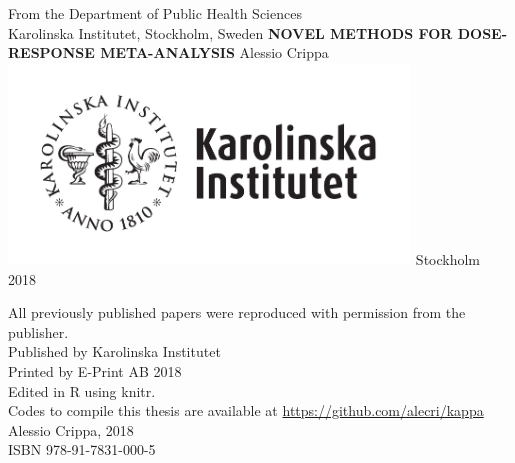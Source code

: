 \documentclass[11pt,a4paper,twoside,openany]{book}\usepackage{knitr}
\begin{document}
\frontmatter
\pagestyle{nothing}

%

\begin{titlepage}
\begin{center}
\large
From the Department of Public Health Sciences \\
Karolinska Institutet, Stockholm, Sweden        
\vfill
\Large
\textbf{\textsf{NOVEL METHODS FOR DOSE-RESPONSE META-ANALYSIS}}
\vfill
\Large
Alessio Crippa
\vfill
\includegraphics[width=0.8\textwidth]{figures/ki-logo_pos}
\vfill
\large
Stockholm 2018        
\end{center}
\restoregeometry
\end{titlepage}

\newpage
\null
\vfill
\noindent All previously published papers were reproduced with permission from the publisher. \\
Published by Karolinska Institutet \\
\bigskip
Printed by E-Print AB 2018 \\
Edited in R using knitr. \\
Codes to compile this thesis are available at \url{https://github.com/alecri/kappa} \\
\textcopyright Alessio Crippa, 2018 \\
ISBN 978-91-7831-000-5
\newpage
\end{document}

